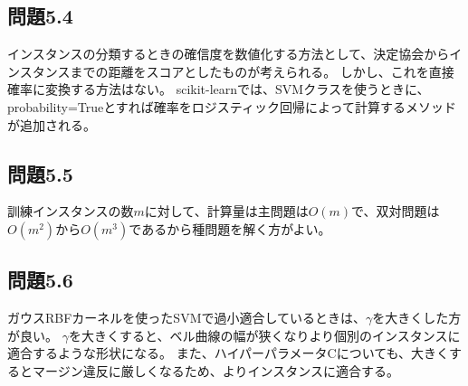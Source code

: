 \documentclass[a4j,twocolumn]{jsarticle}
\begin{document}
\subsection{問題5.4}
インスタンスの分類するときの確信度を数値化する方法として、決定協会からインスタンスまでの距離をスコアとしたものが考えられる。
しかし、これを直接確率に変換する方法はない。
scikit-learnでは、SVMクラスを使うときに、probability=Trueとすれば確率をロジスティック回帰によって計算するメソッドが追加される。

\subsection{問題5.5}
訓練インスタンスの数$m$に対して、計算量は主問題は$O(m)$で、双対問題は$O(m^{2})からO(m^{3})$であるから種問題を解く方がよい。

\subsection{問題5.6}
ガウスRBFカーネルを使ったSVMで過小適合しているときは、$\gamma$を大きくした方が良い。
$\gamma$を大きくすると、ベル曲線の幅が狭くなりより個別のインスタンスに適合するような形状になる。
また、ハイパーパラメータCについても、大きくするとマージン違反に厳しくなるため、よりインスタンスに適合する。
\end{document}
